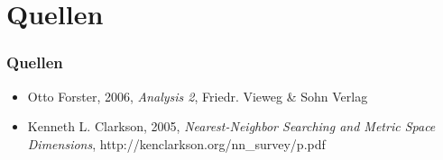 \documentclass{beamer}
\begin{document}
\section{Quellen}
\begin{frame}
 \frametitle{Quellen}
 \begin{itemize}
  \item Otto Forster, 2006, \textit{Analysis 2}, Friedr. Vieweg \& Sohn Verlag
  \item Kenneth L. Clarkson, 2005, \textit{Nearest-Neighbor Searching and Metric Space Dimensions}, http://kenclarkson.org/nn\_survey/p.pdf
  \end{itemize}
\end{frame}
\end{document}
